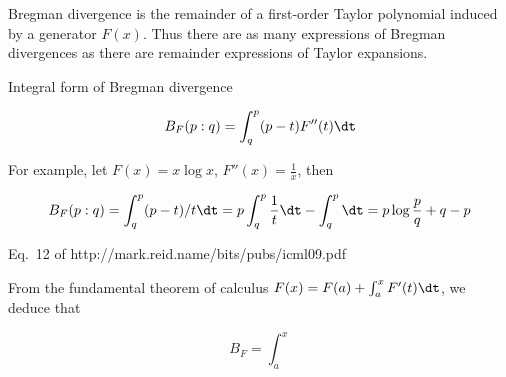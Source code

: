 
Bregman divergence is the remainder of a first-order Taylor polynomial induced by a generator $F(x)$.
Thus there are as many expressions of Bregman divergences as there are remainder expressions of Taylor expansions.


Integral form of Bregman divergence

$$
B_F(p:q)=\int_q^p (p-t)F''(t)\dt
$$

For example, let $F(x)=x\log x$, $F''(x)=\frac{1}{x}$, then

$$
B_F(p:q)=\int_q^p (p-t)/t\dt = p\int_q^p\frac{1}{t}\dt -\int_q^p \dt
= p\log\frac{p}{q}+q-p
$$

Eq.~12 of http://mark.reid.name/bits/pubs/icml09.pdf

From the fundamental theorem of calculus
$F(x)=F(a)+\int_a^x F'(t)\dt$, we deduce that


$$
B_F=\int_a^x 
$$
